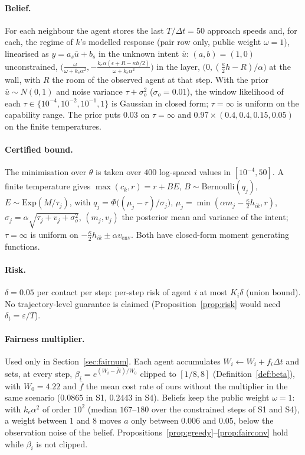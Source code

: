 \documentclass[11pt]{article}
\theoremstyle{definition}
\theoremstyle{remark}
\begin{document}
\paragraph{Belief.} For each neighbour the agent stores the last $T/\Delta t=50$ approach speeds and, for each, the regime of $k$'s modelled response (pair row only, public weight $\omega=1$), linearised as $y=a_s\bar u+b_s$ in the unknown intent $\bar u$: $(a,b)=(1,0)$ unconstrained, $\big(\frac{\omega}{\omega+k_e\alpha^2},-\frac{k_e\alpha(\epsilon+R-\kappa h/2)}{\omega+k_e\alpha^2}\big)$ in the layer, $\big(0,(\frac\kappa2h-R)/\alpha\big)$ at the wall, with $R$ the room of the observed agent at that step. With the prior $\bar u\sim N(0,1)$ and noise variance $\tau+\sigma_o^2$ ($\sigma_o=0.01$), the window likelihood of each $\tau\in\{10^{-4},10^{-2},10^{-1},1\}$ is Gaussian in closed form; $\tau=\infty$ is uniform on the capability range. The prior puts $0.03$ on $\tau=\infty$ and $0.97\times(0.4,0.4,0.15,0.05)$ on the finite temperatures.

\paragraph{Certified bound.} The minimisation over $\theta$ is taken over $400$ log-spaced values in $[10^{-4},50]$. A finite temperature gives $\max(c_k,r)=r+BE$, $B\sim\mathrm{Bernoulli}(q_j)$, $E\sim\mathrm{Exp}(M/\tau_j)$, with $q_j=\Phi\big((\mu_j-r)/\sigma_j\big)$, $\mu_j=\min(\alpha m_j-\frac\kappa2h_{ik},r)$, $\sigma_j=\alpha\sqrt{\tau_j+v_j+\sigma_o^2}$, $(m_j,v_j)$ the posterior mean and variance of the intent; $\tau=\infty$ is uniform on $-\frac\kappa2h_{ik}\pm\alpha v_{\mathrm{env}}$. Both have closed-form moment generating functions.

\paragraph{Risk.} $\delta=0.05$ per contact per step: per-step risk of agent $i$ at most $K_i\delta$ (union bound). No trajectory-level guarantee is claimed (Proposition~\ref{prop:risk} would need $\delta_t=\varepsilon/T$).

\paragraph{Fairness multiplier.} Used only in Section~\ref{sec:fairnum}. Each agent accumulates $W_i\leftarrow W_i+f_i\Delta t$ and sets, at every step, $\beta_i=e^{(W_i-\bar ft)/W_0}$ clipped to $[1/8,8]$ (Definition~\ref{def:beta}), with $W_0=4.22$ and $\bar f$ the mean cost rate of ours without the multiplier in the same scenario ($0.0865$ in S1, $0.2443$ in S4). Beliefs keep the public weight $\omega=1$: with $k_e\alpha^2$ of order $10^2$ (median $167$--$180$ over the constrained steps of S1 and S4), a weight between $1$ and $8$ moves $a$ only between $0.006$ and $0.05$, below the observation noise of the belief. Propositions~\ref{prop:greedy}--\ref{prop:fairconv} hold while $\beta_i$ is not clipped.
\end{document}
